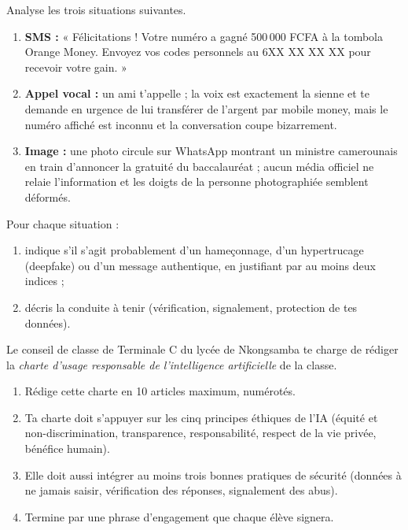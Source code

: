\documentclass[11pt]{article}
\begin{document}
\begin{exercice}
Analyse les trois situations suivantes.
\begin{enumerate}
\item \textbf{SMS :} « Félicitations ! Votre numéro a gagné 500\,000 FCFA à la tombola Orange Money. Envoyez vos codes personnels au 6XX XX XX XX pour recevoir votre gain. »
\item \textbf{Appel vocal :} un ami t'appelle ; la voix est exactement la sienne et te demande en urgence de lui transférer de l'argent par mobile money, mais le numéro affiché est inconnu et la conversation coupe bizarrement.
\item \textbf{Image :} une photo circule sur WhatsApp montrant un ministre camerounais en train d'annoncer la gratuité du baccalauréat ; aucun média officiel ne relaie l'information et les doigts de la personne photographiée semblent déformés.
\end{enumerate}
Pour chaque situation :
\begin{enumerate}[label=\alph*)]
\item indique s'il s'agit probablement d'un hameçonnage, d'un hypertrucage (deepfake) ou d'un message authentique, en justifiant par au moins deux indices ;
\item décris la conduite à tenir (vérification, signalement, protection de tes données).
\end{enumerate}
\end{exercice}

\begin{exercice}
Le conseil de classe de Terminale C du lycée de Nkongsamba te charge de rédiger la \emph{charte d'usage responsable de l'intelligence artificielle} de la classe.
\begin{enumerate}
\item Rédige cette charte en 10 articles maximum, numérotés.
\item Ta charte doit s'appuyer sur les cinq principes éthiques de l'IA (équité et non-discrimination, transparence, responsabilité, respect de la vie privée, bénéfice humain).
\item Elle doit aussi intégrer au moins trois bonnes pratiques de sécurité (données à ne jamais saisir, vérification des réponses, signalement des abus).
\item Termine par une phrase d'engagement que chaque élève signera.
\end{enumerate}
\end{exercice}
\end{document}
